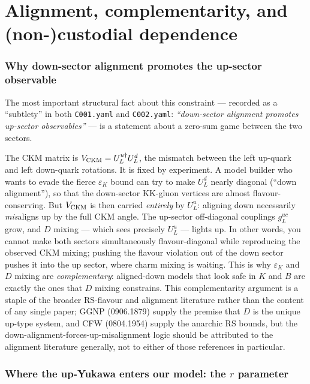 \documentclass[11pt]{article}
\newcommand{\eps}{\varepsilon}
\newcommand{\code}[1]{\texttt{#1}}
\theoremstyle{definition}
\begin{document}
\part{Alignment, complementarity, and (non-)custodial dependence}
\label{part:align}

\section{Why down-sector alignment promotes the up-sector observable}
\label{sec:alignment}

The most important structural fact about this constraint --- recorded as a
``subtlety'' in both \code{C001.yaml} and \code{C002.yaml}: \emph{``down-sector
alignment promotes up-sector observables''} --- is a statement about a
zero-sum game between the two sectors.

The CKM matrix is $V_{\rm CKM}=U_L^{u\dagger}U_L^d$, the mismatch between the
left up-quark and left down-quark rotations. It is fixed by experiment. A model
builder who wants to evade the fierce $\eps_K$ bound can try to make $U_L^d$
nearly diagonal (``down alignment''), so that the down-sector KK-gluon vertices
are almost flavour-conserving. But $V_{\rm CKM}$ is then carried \emph{entirely}
by $U_L^u$: aligning down necessarily \emph{mis}aligns up by the full CKM angle.
The up-sector off-diagonal couplings $g_L^{uc}$ grow, and $D$ mixing --- which
sees precisely $U_L^u$ --- lights up. In other words, you cannot make both
sectors simultaneously flavour-diagonal while reproducing the observed CKM
mixing; pushing the flavour violation out of the down sector pushes it into the
up sector, where charm mixing is waiting. This is why $\eps_K$ and $D$ mixing
are \emph{complementary}: aligned-down models that look safe in $K$ and $B$ are
exactly the ones that $D$ mixing constrains. This complementarity argument is a
staple of the broader RS-flavour and alignment literature rather than the
content of any single paper; GGNP (0906.1879) supply the premise that $D$ is the
unique up-type system, and CFW (0804.1954) supply the anarchic RS bounds, but
the down-alignment-forces-up-misalignment logic should be attributed to the
alignment literature generally, not to either of those references in
particular.

\section{Where the up-Yukawa enters our model: the $r$ parameter}
\label{sec:rparam}
\end{document}
